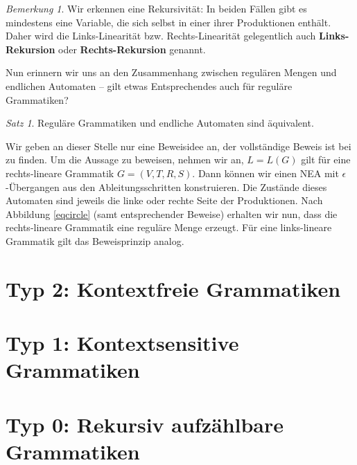 \documentclass[11pt,a4paper]{scrreport}
\theoremstyle{remark}
\newtheorem{note}{Bemerkung}
\theoremstyle{custom}
\newtheorem{satz}{Satz}[section]
\begin{document}
\begin{note}
Wir erkennen eine Rekursivität: In beiden Fällen gibt es mindestens eine Variable, die sich selbst in einer ihrer Produktionen enthält. Daher wird die Links-Linearität bzw. Rechts-Linearität gelegentlich auch \textbf{Links-Rekursion} oder \textbf{Rechts-Rekursion} genannt.
\end{note}
Nun erinnern wir uns an den Zusammenhang zwischen regulären Mengen und endlichen Automaten -- gilt etwas Entsprechendes auch für reguläre Grammatiken?
\begin{satz}
Reguläre Grammatiken und endliche Automaten sind äquivalent.
\end{satz}
Wir geben an dieser Stelle nur eine Beweisidee an, der vollständige Beweis ist bei \parencite[][S. 228]{Hopcroft} zu finden. Um die Aussage zu beweisen, nehmen wir an, $L = L(G)$ gilt für eine rechts-lineare Grammatik $G = (V, T, R, S)$. Dann können wir einen NEA mit $\epsilon$-Übergangen aus den Ableitungsschritten konstruieren. Die Zustände dieses Automaten sind jeweils die linke oder rechte Seite der Produktionen. Nach Abbildung \ref{eqcircle} (samt entsprechender Beweise) erhalten wir nun, dass die rechts-lineare Grammatik eine reguläre Menge erzeugt. Für eine links-lineare Grammatik gilt das Beweisprinzip analog.
\section{Typ 2: Kontextfreie Grammatiken}
\section{Typ 1: Kontextsensitive Grammatiken}
\section{Typ 0: Rekursiv aufzählbare Grammatiken}
\pagebreak
\normalem
\printbibliography
\end{document}
